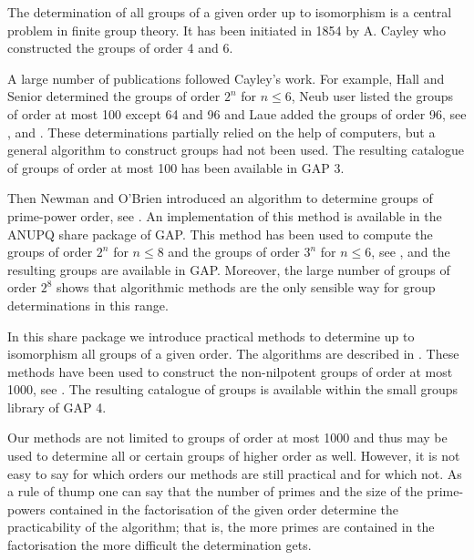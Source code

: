 

The determination of all groups of a given order up to isomorphism
is a central problem in finite group theory. It has been initiated
in 1854 by A. Cayley who constructed the groups of order 4 and 6.

A large number of publications followed Cayley's work. For example,
Hall and Senior determined the groups of order $2^n$ for $n \leq 6$,
Neub{ u}ser listed the groups of order at most 100 except 64 and 96
and Laue added the groups of order 96, see \cite{HS64}, \cite{Neu67}
and \cite{Lau82}. These determinations partially relied on the
help of computers, but a general algorithm to construct groups had
not been used. The resulting catalogue of groups of order at most
100 has been available in GAP 3.

Then Newman and O'Brien introduced an algorithm to determine
groups of prime-power order, see \cite{OBr90}. An implementation 
of this method is available in the ANUPQ share package of GAP. 
This method has been used to compute the groups of order $2^n$ for 
$n \leq 8$ and the groups of order $3^n$ for $n \leq 6$, see
\cite{OBr88}, and the resulting groups are available in GAP.
Moreover, the large number of groups of order $2^8$ shows that
algorithmic methods are the only sensible way for group determinations
in this range.

In this share package we introduce practical methods to determine
up to isomorphism all groups of a given order. The algorithms 
are described in \cite{BE99}. These methods have been used to 
construct the non-nilpotent groups of order at most 1000, see 
\cite{BE1000}. The resulting catalogue of groups is available within
the small groups library of GAP 4. 

Our methods are not limited to groups of order at most 1000
and thus may be used to determine all or certain groups of 
higher order as well. However, it is not easy to say for 
which orders our methods are still practical and for which
not. As a rule of thump one can say that the number of 
primes and the size of the prime-powers contained in the 
factorisation of the given order determine the practicability 
of the algorithm; that is, the more primes are contained in
the factorisation the more difficult the determination gets. 


